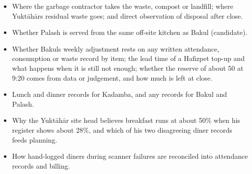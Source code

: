 \documentclass[
  10pt,
  table]{article}
\begin{document}
\begin{itemize}
  The contract terms: the plate rate, how deductions work and whether costs pass through to the operator; whether Bakul is paid on plates served, as its manager says, and whether Kadamba\textquotesingle s basis differs, confirmed from the contract or dining services.
\item
  Where the garbage contractor takes the waste, compost or landfill; where Yuktāhār\textquotesingle s residual waste goes; and direct observation of disposal after close.
\item
  Whether Palash is served from the same off-site kitchen as Bakul (candidate).
\item
  Whether Bakul\textquotesingle s weekly adjustment rests on any written attendance, consumption or waste record by item; the lead time of a Hafizpet top-up and what happens when it is still not enough; whether the reserve of about 50 at 9:20 comes from data or judgement, and how much is left at close.
\item
  Lunch and dinner records for Kadamba, and any records for Bakul and Palash.
\item
  Why the Yuktāhār site head believes breakfast runs at about 50\% when his register shows about 28\%, and which of his two disagreeing diner records feeds planning.
\item
  How hand-logged diners during scanner failures are reconciled into attendance records and billing.
\end{itemize}
\end{document}
